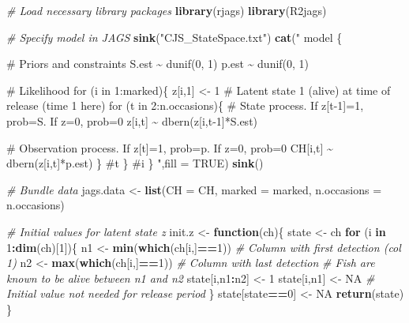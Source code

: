 \documentclass[
]{krantz}
\makeatletter
\newenvironment{Shaded}{\begin{snugshade}}{\end{snugshade}}
\newcommand{\AttributeTok}[1]{\textcolor[rgb]{0.27,0.27,0.27}{#1}}
\newcommand{\CommentTok}[1]{\textcolor[rgb]{0.37,0.37,0.37}{\textit{#1}}}
\newcommand{\ConstantTok}[1]{\textcolor[rgb]{0.37,0.37,0.37}{#1}}
\newcommand{\ControlFlowTok}[1]{\textcolor[rgb]{0.27,0.27,0.27}{\textbf{#1}}}
\newcommand{\DecValTok}[1]{\textcolor[rgb]{0.06,0.06,0.06}{#1}}
\newcommand{\FunctionTok}[1]{\textcolor[rgb]{0.27,0.27,0.27}{\textbf{#1}}}
\newcommand{\NormalTok}[1]{#1}
\newcommand{\OtherTok}[1]{\textcolor[rgb]{0.37,0.37,0.37}{#1}}
\newcommand{\SpecialCharTok}[1]{\textcolor[rgb]{0.43,0.43,0.43}{\textbf{#1}}}
\newcommand{\StringTok}[1]{\textcolor[rgb]{0.5,0.5,0.5}{#1}}
\newenvironment{kframe}{%
\medskip{}
\setlength{\fboxsep}{.8em}
 \def\at@end@of@kframe{}%
 \ifinner\ifhmode%
  \def\at@end@of@kframe{\end{minipage}}%
  \begin{minipage}{\columnwidth}%
 \fi\fi%
 \def\FrameCommand##1{\hskip\@totalleftmargin \hskip-\fboxsep
 \colorbox{shadecolor}{##1}\hskip-\fboxsep
     \hskip-\linewidth \hskip-\@totalleftmargin \hskip\columnwidth}%
 \MakeFramed {\advance\hsize-\width
   \@totalleftmargin\z@ \linewidth\hsize
   \@setminipage}}%
 {\par\unskip\endMakeFramed%
 \at@end@of@kframe}
\renewenvironment{Shaded}{\begin{kframe}}{\end{kframe}}
\makeatother
\begin{document}
\begin{Shaded}
\begin{Highlighting}[]
\CommentTok{\# Load necessary library packages}
\FunctionTok{library}\NormalTok{(rjags)}
\FunctionTok{library}\NormalTok{(R2jags)}

\CommentTok{\# Specify model in JAGS}
\FunctionTok{sink}\NormalTok{(}\StringTok{"CJS\_StateSpace.txt"}\NormalTok{)}
\FunctionTok{cat}\NormalTok{(}\StringTok{"}
\StringTok{model \{}

\StringTok{\# Priors and constraints}
\StringTok{S.est \textasciitilde{} dunif(0, 1)}
\StringTok{p.est \textasciitilde{} dunif(0, 1)}

\StringTok{\# Likelihood}
\StringTok{for (i in 1:marked)\{}
\StringTok{   z[i,1] \textless{}{-} 1 \# Latent state 1 (alive) at time of release (time 1 here)}
\StringTok{   for (t in 2:n.occasions)\{}
\StringTok{      \# State process. If z[t{-}1]=1, prob=S. If z=0, prob=0}
\StringTok{      z[i,t] \textasciitilde{} dbern(z[i,t{-}1]*S.est)}

\StringTok{      \# Observation process. If z[t]=1, prob=p. If z=0, prob=0}
\StringTok{      CH[i,t] \textasciitilde{} dbern(z[i,t]*p.est)}
\StringTok{      \} \#t}
\StringTok{   \} \#i}
\StringTok{\}}
\StringTok{"}\NormalTok{,}\AttributeTok{fill =} \ConstantTok{TRUE}\NormalTok{)}
\FunctionTok{sink}\NormalTok{()}

\CommentTok{\# Bundle data}
\NormalTok{jags.data }\OtherTok{\textless{}{-}} \FunctionTok{list}\NormalTok{(}\AttributeTok{CH =}\NormalTok{ CH, }\AttributeTok{marked =}\NormalTok{ marked, }\AttributeTok{n.occasions =}\NormalTok{ n.occasions)}

\CommentTok{\# Initial values for latent state z}
\NormalTok{init.z }\OtherTok{\textless{}{-}} \ControlFlowTok{function}\NormalTok{(ch)\{}
\NormalTok{  state }\OtherTok{\textless{}{-}}\NormalTok{ ch}
  \ControlFlowTok{for}\NormalTok{ (i }\ControlFlowTok{in} \DecValTok{1}\SpecialCharTok{:}\FunctionTok{dim}\NormalTok{(ch)[}\DecValTok{1}\NormalTok{])\{}
\NormalTok{    n1 }\OtherTok{\textless{}{-}} \FunctionTok{min}\NormalTok{(}\FunctionTok{which}\NormalTok{(ch[i,]}\SpecialCharTok{==}\DecValTok{1}\NormalTok{)) }\CommentTok{\# Column with first detection (col 1)}
\NormalTok{    n2 }\OtherTok{\textless{}{-}} \FunctionTok{max}\NormalTok{(}\FunctionTok{which}\NormalTok{(ch[i,]}\SpecialCharTok{==}\DecValTok{1}\NormalTok{)) }\CommentTok{\# Column with last detection}
    \CommentTok{\# Fish are known to be alive between n1 and n2}
\NormalTok{    state[i,n1}\SpecialCharTok{:}\NormalTok{n2] }\OtherTok{\textless{}{-}} \DecValTok{1}
\NormalTok{    state[i,n1] }\OtherTok{\textless{}{-}} \ConstantTok{NA} \CommentTok{\# Initial value not needed for release period}
\NormalTok{  \}}
\NormalTok{  state[state}\SpecialCharTok{==}\DecValTok{0}\NormalTok{] }\OtherTok{\textless{}{-}} \ConstantTok{NA}
  \FunctionTok{return}\NormalTok{(state)}
\NormalTok{\}}


\end{Highlighting}
\end{Shaded}
\end{document}
